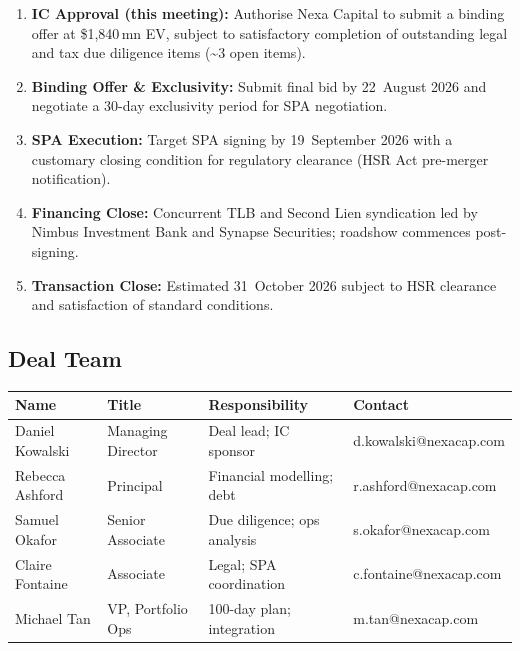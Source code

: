 \begin{enumerate}
  \item \textbf{IC Approval (this meeting):} Authorise Nexa Capital to submit a binding offer
    at \$1,840\,mn EV, subject to satisfactory completion of outstanding legal and tax due
    diligence items (\textasciitilde 3 open items).
  \item \textbf{Binding Offer \& Exclusivity:} Submit final bid by 22~August 2026 and negotiate
    a 30-day exclusivity period for SPA negotiation.
  \item \textbf{SPA Execution:} Target SPA signing by 19~September 2026 with a customary
    closing condition for regulatory clearance (HSR Act pre-merger notification).
  \item \textbf{Financing Close:} Concurrent TLB and Second Lien syndication led by Nimbus
    Investment Bank and Synapse Securities; roadshow commences post-signing.
  \item \textbf{Transaction Close:} Estimated 31~October 2026 subject to HSR clearance and
    satisfaction of standard conditions.
\end{enumerate}

\vspace{14pt}
\colourrule[GoldAccent]

\subsection{Deal Team}

\begin{tabularx}{\linewidth}{llXl}
  \toprule
  \rowcolor{NavyDark}
  \color{white}\textbf{Name} &
  \color{white}\textbf{Title} &
  \color{white}\textbf{Responsibility} &
  \color{white}\textbf{Contact} \\
  \midrule
  \rowcolor{IceBlue}
  Daniel Kowalski   & Managing Director   & Deal lead; IC sponsor        & d.kowalski@nexacap.com \\
  Rebecca Ashford   & Principal           & Financial modelling; debt    & r.ashford@nexacap.com  \\
  \rowcolor{IceBlue}
  Samuel Okafor     & Senior Associate    & Due diligence; ops analysis  & s.okafor@nexacap.com   \\
  Claire Fontaine   & Associate           & Legal; SPA coordination      & c.fontaine@nexacap.com \\
  \rowcolor{IceBlue}
  Michael Tan       & VP, Portfolio Ops   & 100-day plan; integration    & m.tan@nexacap.com      \\
  \bottomrule
\end{tabularx}

